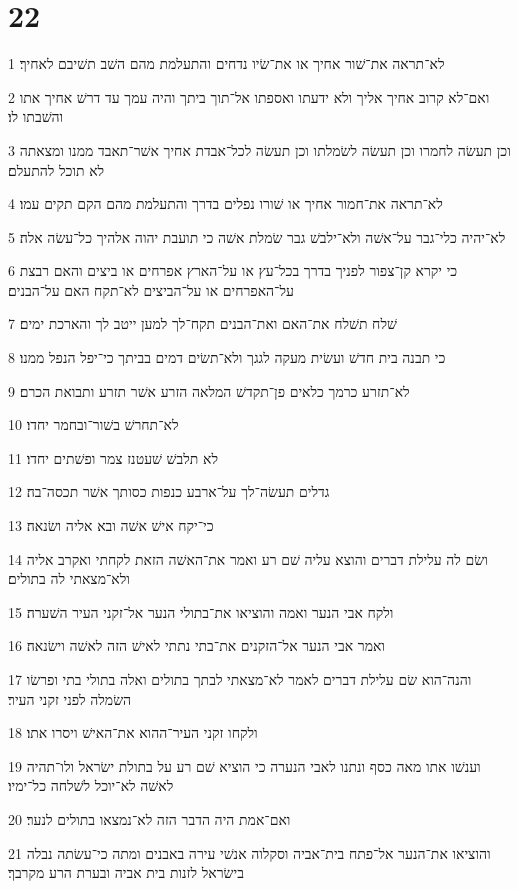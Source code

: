 \chapter{22}

\par 1 לא־תראה את־שׁור אחיך או את־שׂיו נדחים והתעלמת מהם השׁב תשׁיבם לאחיך׃
\par 2 ואם־לא קרוב אחיך אליך ולא ידעתו ואספתו אל־תוך ביתך והיה עמך עד דרשׁ אחיך אתו והשׁבתו לו׃
\par 3 וכן תעשׂה לחמרו וכן תעשׂה לשׂמלתו וכן תעשׂה לכל־אבדת אחיך אשׁר־תאבד ממנו ומצאתה לא תוכל להתעלם׃
\par 4 לא־תראה את־חמור אחיך או שׁורו נפלים בדרך והתעלמת מהם הקם תקים עמו׃
\par 5 לא־יהיה כלי־גבר על־אשׁה ולא־ילבשׁ גבר שׂמלת אשׁה כי תועבת יהוה אלהיך כל־עשׂה אלה׃
\par 6 כי יקרא קן־צפור לפניך בדרך בכל־עץ או על־הארץ אפרחים או ביצים והאם רבצת על־האפרחים או על־הביצים לא־תקח האם על־הבנים׃
\par 7 שׁלח תשׁלח את־האם ואת־הבנים תקח־לך למען ייטב לך והארכת ימים׃
\par 8 כי תבנה בית חדשׁ ועשׂית מעקה לגגך ולא־תשׂים דמים בביתך כי־יפל הנפל ממנו׃
\par 9 לא־תזרע כרמך כלאים פן־תקדשׁ המלאה הזרע אשׁר תזרע ותבואת הכרם׃
\par 10 לא־תחרשׁ בשׁור־ובחמר יחדו׃
\par 11 לא תלבשׁ שׁעטנז צמר ופשׁתים יחדו׃
\par 12 גדלים תעשׂה־לך על־ארבע כנפות כסותך אשׁר תכסה־בה׃
\par 13 כי־יקח אישׁ אשׁה ובא אליה ושׂנאה׃
\par 14 ושׂם לה עלילת דברים והוצא עליה שׁם רע ואמר את־האשׁה הזאת לקחתי ואקרב אליה ולא־מצאתי לה בתולים׃
\par 15 ולקח אבי הנער ואמה והוציאו את־בתולי הנער אל־זקני העיר השׁערה׃
\par 16 ואמר אבי הנער אל־הזקנים את־בתי נתתי לאישׁ הזה לאשׁה וישׂנאה׃
\par 17 והנה־הוא שׂם עלילת דברים לאמר לא־מצאתי לבתך בתולים ואלה בתולי בתי ופרשׂו השׂמלה לפני זקני העיר׃
\par 18 ולקחו זקני העיר־ההוא את־האישׁ ויסרו אתו׃
\par 19 וענשׁו אתו מאה כסף ונתנו לאבי הנערה כי הוציא שׁם רע על בתולת ישׂראל ולו־תהיה לאשׁה לא־יוכל לשׁלחה כל־ימיו׃
\par 20 ואם־אמת היה הדבר הזה לא־נמצאו בתולים לנער׃
\par 21 והוציאו את־הנער אל־פתח בית־אביה וסקלוה אנשׁי עירה באבנים ומתה כי־עשׂתה נבלה בישׂראל לזנות בית אביה ובערת הרע מקרבך׃
